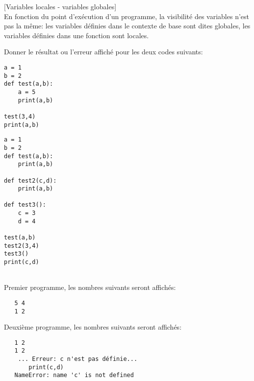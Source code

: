 \documentclass[a4paper,12pt]{article}
\newcommand{\numero}{11}                                    %
\begin{document}
\newpage
\exo{}[Variables locales - variables globales]  ~\\ 
En fonction du point d'exécution d'un programme, la visibilité des variables n'est pas la même: les variables définies dans le contexte de base sont dites globales, les variables définies dans une fonction sont locales.

Donner le résultat ou l'erreur affiché pour les deux codes suivants:
\begin{lstlisting}
a = 1
b = 2
def test(a,b):
    a = 5
    print(a,b)

test(3,4)
print(a,b)
\end{lstlisting} 

\begin{lstlisting}
a = 1
b = 2
def test(a,b):
    print(a,b)
    
def test2(c,d):
    print(a,b)
    
def test3():
    c = 3
    d = 4

test(a,b)
test2(3,4)
test3()
print(c,d)
\end{lstlisting}
\begin{correction}
	~\\ \vspace{-5pt}
    Premier programme, les nombres suivants seront affichés:
   \begin{lstlisting}
   5 4
   1 2
   \end{lstlisting}
    Deuxième programme, les nombres suivants seront affichés:
   \begin{lstlisting}
   1 2
   1 2
    ... Erreur: c n'est pas définie...
       print(c,d)
   NameError: name 'c' is not defined
   \end{lstlisting}

\end{correction}


\finexo

		\newpage
		\setcounter{page}{1}
		\setcounter{section}{\numero}
		

		\section{}
	
\end{document}
